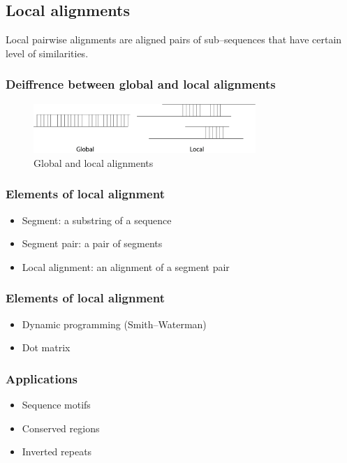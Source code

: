 %
%

%
%
\subsection{Local alignments}
Local pairwise alignments are aligned pairs of sub--sequences that have certain level of similarities.

%
%
\subsubsection*{Deiffrence between global and local alignments} 

\begin{figure}[H]
  \centering
      \includegraphics[width=0.75\textwidth]{fig04/global_and_local_alignments.png}
  \caption{Global and local alignments}
\end{figure}

%
%
\subsubsection*{Elements of local alignment}
\begin{itemize}
\item Segment: a substring of a sequence
\item Segment pair: a pair of segments
\item Local alignment: an alignment of a segment pair
\end{itemize}

%
%
\subsubsection*{Elements of local alignment}
\begin{itemize}
\item Dynamic programming (Smith--Waterman)
\item Dot matrix
\end{itemize}

%
%
\subsubsection*{Applications}
\begin{itemize}
\item Sequence motifs
\item Conserved regions
\item Inverted repeats
\end{itemize}

\bigskip 

%
